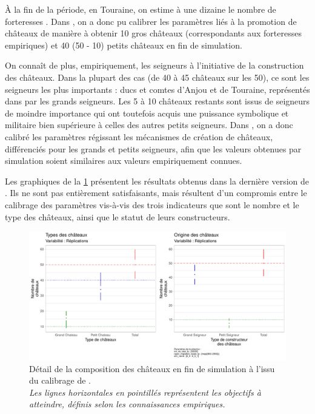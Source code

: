 À la fin de la période, en Touraine, on estime à une dizaine le nombre de \og forteresses\fg{}%
.
Dans \simfeodal{}, on a donc pu calibrer les paramètres liés à la promotion de châteaux de manière à obtenir 10 gros châteaux (correspondants aux forteresses empiriques) et 40 (50 - 10) petits châteaux en fin de simulation.

On connaît de plus, empiriquement, les seigneurs à l'initiative de la construction des châteaux.
Dans la plupart des cas (de 40 à 45 châteaux sur les 50), ce sont les seigneurs les plus importants : ducs et comtes d'Anjou et de Touraine, représentés dans \simfeodal{} par les grands seigneurs.
Les 5 à 10 châteaux restants sont issus de seigneurs de moindre importance qui ont toutefois acquis une puissance symbolique et militaire bien supérieure à celles des autres petits seigneurs.
Dans \simfeodal{}, on a donc calibré les paramètres régissant les mécanismes de création de châteaux, différenciés pour les grands et petits seigneurs, afin que les valeurs obtenues par simulation soient similaires aux valeurs empiriquement connues.

Les graphiques de la \cref{fig:calibrage-chateaux-composition} présentent les résultats obtenus dans la dernière version de \simfeodal{}.
Ils ne sont pas entièrement satisfaisants, mais résultent d'un compromis entre le calibrage des paramètres vis-à-vis des trois indicateurs que sont le nombre et le type des châteaux, ainsi que le statut de leurs constructeurs.

\begin{figure}[H]
	\centering
	\includegraphics[width=.95\linewidth]{img/Chateaux_Types_condenses.pdf}
	\caption[Détail de la composition des châteaux en fin de simulation à l'issu du calibrage de \simfeodal{}.]{Détail de la composition des châteaux en fin de simulation à l'issu du calibrage de \simfeodal{}.\\
	\textit{Les lignes horizontales en pointillés représentent les objectifs à atteindre, définis selon les connaissances empiriques.}
\smallskip}
	\label{fig:calibrage-chateaux-composition}
\end{figure}



